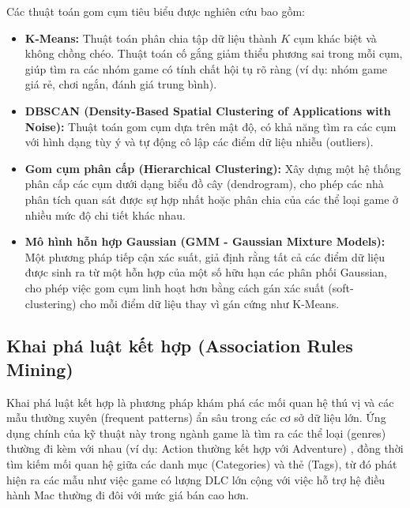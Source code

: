 \hspace{1cm} Các thuật toán gom cụm tiêu biểu được nghiên cứu bao gồm:
\begin{itemize}
    \item \textbf{K-Means:} Thuật toán phân chia tập dữ liệu thành $K$ cụm khác biệt và không chồng chéo. Thuật toán cố gắng giảm thiểu phương sai trong mỗi cụm, giúp tìm ra các nhóm game có tính chất hội tụ rõ ràng (ví dụ: nhóm game giá rẻ, chơi ngắn, đánh giá trung bình).
    \item \textbf{DBSCAN (Density-Based Spatial Clustering of Applications with Noise):} Thuật toán gom cụm dựa trên mật độ, có khả năng tìm ra các cụm với hình dạng tùy ý và tự động cô lập các điểm dữ liệu nhiễu (outliers).
    \item \textbf{Gom cụm phân cấp (Hierarchical Clustering):} Xây dựng một hệ thống phân cấp các cụm dưới dạng biểu đồ cây (dendrogram), cho phép các nhà phân tích quan sát được sự hợp nhất hoặc phân chia của các thể loại game ở nhiều mức độ chi tiết khác nhau.
    \item \textbf{Mô hình hỗn hợp Gaussian (GMM - Gaussian Mixture Models):} Một phương pháp tiếp cận xác suất, giả định rằng tất cả các điểm dữ liệu được sinh ra từ một hỗn hợp của một số hữu hạn các phân phối Gaussian, cho phép việc gom cụm linh hoạt hơn bằng cách gán xác suất (soft-clustering) cho mỗi điểm dữ liệu thay vì gán cứng như K-Means.
\end{itemize}

\subsection{Khai phá luật kết hợp (Association Rules Mining)}
\hspace{1cm} Khai phá luật kết hợp là phương pháp khám phá các mối quan hệ thú vị và các mẫu thường xuyên (frequent patterns) ẩn sâu trong các cơ sở dữ liệu lớn. Ứng dụng chính của kỹ thuật này trong ngành game là tìm ra các thể loại (genres) thường đi kèm với nhau (ví dụ: Action thường kết hợp với Adventure) , đồng thời tìm kiếm mối quan hệ giữa các danh mục (Categories) và thẻ (Tags), từ đó phát hiện ra các mẫu như việc game có lượng DLC lớn cộng với việc hỗ trợ hệ điều hành Mac thường đi đôi với mức giá bán cao hơn.

